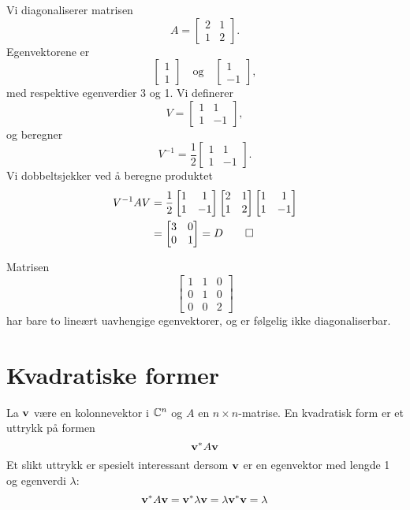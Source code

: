 \begin{ex}	
Vi diagonaliserer matrisen 
\[
A=
\begin{bmatrix}
2     & 1 \\
1      & 2
\end{bmatrix}.
\]
Egenvektorene er 
\[
\begin{bmatrix}
1 \\ 1
\end{bmatrix}
\quad \text{og} \quad
\begin{bmatrix}
1 \\ -1
\end{bmatrix},
\]
med respektive egenverdier 3 og 1. Vi definerer
\[
V=
\begin{bmatrix}
1 & 1 \\ 1 &-1
\end{bmatrix},
\]
og beregner 
\[
V^{-1}=
\frac{1}{2}
\begin{bmatrix}
1 & 1 \\ 1 &-1
\end{bmatrix}.
\]
Vi dobbeltsjekker ved å beregne produktet
\begin{align*}
V^{-1}AV&=
\frac{1}{2}
\begin{bmatrix}
1 & 1 \\ 1 &-1
\end{bmatrix}
\begin{bmatrix}
2     & 1 \\
1      & 2
\end{bmatrix}
\begin{bmatrix}
1 & 1 \\ 1 &-1
\end{bmatrix}
\\& =
\begin{bmatrix}
3     & 0 \\
0      & 1
\end{bmatrix}
=
D \qedhere
\end{align*}
\end{ex}


\begin{ex}
Matrisen 
\[
\begin{bmatrix}
1 & 1 & 0\\  0 &1 & 0 \\ 0 & 0 & 2
\end{bmatrix}
\]
har bare to lineært uavhengige egenvektorer, og er følgelig ikke diagonaliserbar.
\end{ex}


\section*{Kvadratiske former}
La $\mathbf{v}$ være en kolonnevektor i $\mathbb{C}^n$ og $A$ en $n\times n$-matrise. En kvadratisk form er et uttrykk på formen 
\[
\mathbf{v}^* A \mathbf{v}
\]
Et slikt uttrykk er spesielt interessant dersom $\mathbf{v}$ er en egenvektor med lengde 1 og egenverdi $\lambda$:
\[
\mathbf{v}^* A \mathbf{v}=\mathbf{v}^* \lambda \mathbf{v}=\lambda \mathbf{v}^* \mathbf{v}=\lambda
\]



